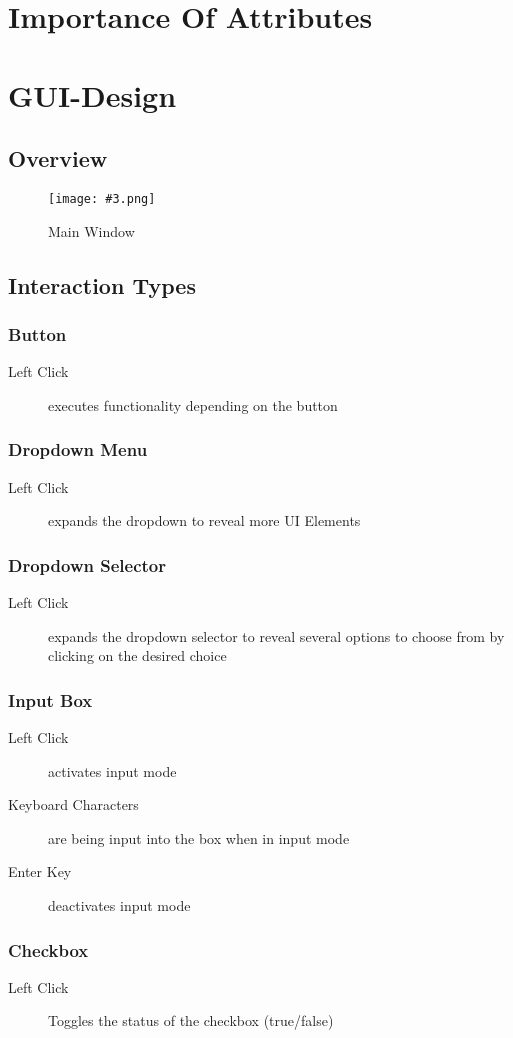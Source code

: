 \documentclass[10pt,a4paper]{report}
\newcommand{\h}[1]{\textcolor{col:highlight}{#1}}
\newcommand{\defit}[3]{\subsection{#2}\label{it:#1}#3}
\newcommand{\includeimage}[5]{
    \begin{figure}[H]
        #1
        \texttt{[image: \#3.png]}
        \caption{#4}
        \label{fig:#5}
    \end{figure}
}
\begin{document}
\chapter{Importance Of Attributes}

\chapter{GUI-Design}
\section{Overview}
\includeimage{}{0.4}{Main Window}{Main Window}{main_window}

\section{Interaction Types}
\defit{button}{Button}{
    \begin{description}
        \item[Left Click]{executes functionality depending on the button}
    \end{description}
}
\defit{dropdown_menu}{Dropdown Menu}{
    \begin{description}
            \item[Left Click]{expands the dropdown to reveal more UI Elements}
    \end{description}
}
\defit{dropdown_selector}{Dropdown Selector}{
    \begin{description}
            \item[Left Click]{expands the dropdown selector to reveal several options to choose from by clicking on the desired choice}
    \end{description}
}
\defit{input_box}{Input Box}{
    \begin{description}
        \item[Left Click]{activates \h{input mode}}
        \item[Keyboard Characters]{are being input into the box when in \h{input mode}}
        \item[Enter Key]{deactivates \h{input mode}}
    \end{description}
}
\defit{checkbox}{Checkbox}{
    \begin{description}
        \item[Left Click]{Toggles the status of the checkbox (true/false)}
    \end{description}
}
\end{document}
